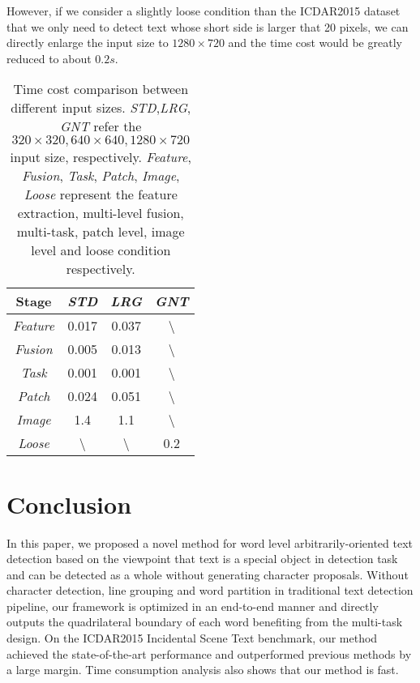 \documentclass[10pt,twocolumn,letterpaper]{article}
\begin{document}
	However, if we consider a slightly loose condition than the ICDAR2015 dataset that we only need to detect text whose short side is larger that 20 pixels, we can directly enlarge the input size to $1280 \times 720$ and the time cost would be greatly reduced to about $0.2s$.
	
	\begin{table}
		\label{Tab.4}
		\small
		\renewcommand\arraystretch{1.2}
		\centering
		\caption{Time cost comparison between different input sizes. \emph{STD},\emph{LRG}, \emph{GNT} refer the $320\times320, 640\times640, 1280\times720$ input size, respectively. \emph{Feature}, \emph{Fusion}, \emph{Task}, \emph{Patch}, \emph{Image}, \emph{Loose} represent the feature extraction, multi-level fusion, multi-task, patch level, image level and loose condition respectively.}
		
		\begin{tabular}{|c|c|c|c|}
			\hline
			Stage & \emph{STD} & \emph{LRG} & \emph{GNT} \\
			\hline
			\hline
			\emph{Feature} & 0.017 & 0.037 & \textbackslash \\
			\hline
			\emph{Fusion} & 0.005 & 0.013 & \textbackslash \\
			\hline
			\emph{Task} & 0.001 & 0.001 & \textbackslash \\
			\hline
			\emph{Patch} & 0.024 & 0.051 & \textbackslash \\
			\hline
			\emph{Image} & 1.4 & 1.1 & \textbackslash \\
			\hline
			\emph{Loose} & \textbackslash & \textbackslash & 0.2 \\
			\hline
		\end{tabular}
	\end{table}
	
\section{Conclusion}
	\label{Sec.5}
	In this paper, we proposed a novel method for word level arbitrarily-oriented text detection based on the viewpoint that text is a special object in detection task and can be detected as a whole without generating character proposals. 
	Without character detection, line grouping and word partition in traditional text detection pipeline, our framework is optimized in an end-to-end manner and directly outputs the quadrilateral boundary of each word benefiting from the multi-task design. 
	On the ICDAR2015 Incidental Scene Text benchmark, our method achieved the state-of-the-art performance and outperformed previous methods by a large margin. 
	Time consumption analysis also shows that our method is fast.

{\small
%


}
\end{document}
